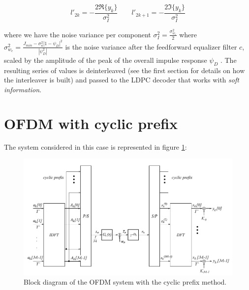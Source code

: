 \documentclass[a4paper,11.5pt]{article}
\begin{document}
\begin{equation}
l'_{2k} =- \frac{2 \Re\{y_k\}}{\sigma_{I}^2} \quad \quad
l'_{2k+1}= - \frac{2 \Im\{y_k\}}{\sigma_{I}^2}
\end{equation}

where we have the noise variance per component $\sigma_I^2=\frac{\sigma_{w_c}^2}{2}$ where  $\sigma_{w_c}^2 = \frac{J_{min}-\sigma_a^2 |1-\psi_D|^2}{|\psi_D^2|}$ is the noise variance after the feedforward equalizer filter $c$, scaled by the amplitude of the peak of the overall impulse response $\psi_D$ . The resulting series of values is deinterleaved (see the first section for details on how the interleaver is built) and passed to the LDPC decoder that works with \emph{soft information}.

\section*{OFDM with cyclic prefix}

The system considered in this case is represented in figure \ref{fig:ofdm_schema}:
 
\begin{figure}[H]
	\begin{center}   
		\includegraphics[width=\textwidth]{figs/OFDM_schema.png} 
		\caption{Block diagram of the OFDM system with the cyclic prefix method.}
		\label{fig:ofdm_schema}
	\end{center}
\end{figure}
\end{document}

